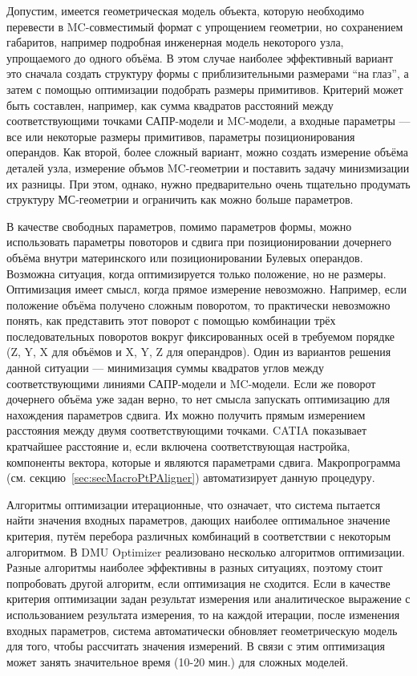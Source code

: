 Допустим, имеется геометрическая модель объекта, которую необходимо перевести в MC-совместимый формат с упрощением геометрии, но сохранением габаритов, например подробная инженерная модель некоторого узла, упрощаемого до одного объёма. В этом случае наиболее эффективный вариант это сначала создать структуру формы с приблизительными размерами ``на глаз'', а затем с помощью оптимизации подобрать размеры примитивов. Критерий может быть составлен, например, как сумма квадратов расстояний между соответствующими точками САПР-модели и MC-модели, а входные параметры --- все или некоторые размеры примитивов, параметры позиционирования операндов.
Как второй, более сложный вариант, можно создать измерение объёма деталей узла, измерение объмов MC-геометрии и поставить задачу минизмизации их разницы. При этом, однако, нужно предварительно очень тщательно продумать структуру МС-геометрии и ограничить как можно больше параметров.

В качестве свободных параметров, помимо параметров формы, можно использовать параметры повоторов и сдвига при позиционировании дочернего объёма внутри материнского или позиционировании Булевых операндов. Возможна ситуация, когда оптимизируется только положение, но не размеры. Оптимизация имеет смысл, когда прямое измерение невозможно. Например, если положение объёма получено сложным поворотом, то практически невозможно понять, как представить этот поворот с помощью комбинации трёх последовательных поворотов вокруг фиксированных осей в требуемом порядке (Z, Y, X для объёмов и X, Y, Z для операндров). Один из вариантов решения данной ситуации --- минимизация суммы квадратов углов между соответствующими линиями САПР-модели и MC-модели. Если же поворот дочернего объёма уже задан верно, то нет смысла запускать оптимизацию для нахождения параметров сдвига. Их можно получить прямым измерением расстояния между двумя соответствующими точками. CATIA показывает кратчайшее расстояние и, если включена соответствующая настройка, компоненты вектора, которые и являются параметрами сдвига. Макропрограмма  (см. секцию~\ref{sec:secMacroPtPAligner}) автоматизирует данную процедуру.

Алгоритмы оптимизации итерационные, что означает, что система пытается найти значения входных параметров, дающих наиболее оптимальное значение критерия, путём перебора различных комбинаций в соответствии с некоторым алгоритмом. В DMU Optimizer реализовано несколько алгоритмов оптимизации. Разные алгоритмы наиболее эффективны в разных ситуациях, поэтому стоит попробовать другой алгоритм, если оптимизация не сходится. Если в качестве критерия оптимизации задан результат измерения или аналитическое выражение с использованием результата измерения, то на каждой итерации, после изменения входных параметров, система автоматически обновляет геометрическую модель для того, чтобы рассчитать значения измерений. В связи с этим оптимизация может занять значительное время (10-20 мин.) для сложных моделей.

